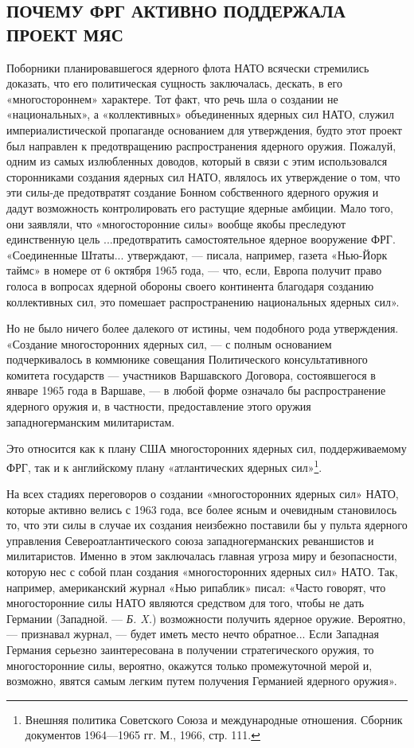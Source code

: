 \documentclass[12pt, a4paper, openany]{book}
\begin{document}
	\subsection[Почему ФРГ активно поддержала проект МЯС]{\center ПОЧЕМУ ФРГ АКТИВНО ПОДДЕРЖАЛА ПРОЕКТ МЯС}
	
	
	Поборники планировавшегося ядерного флота НАТО всячески стремились доказать, что его политическая сущность заключалась, дескать, в его «многостороннем» характере. Тот факт, что речь шла о создании не «национальных», а «коллективных» объединенных ядерных сил НАТО, служил империалистической пропаганде основанием для утверждения, будто этот проект был направлен к предотвращению распространения ядерного оружия. Пожалуй, одним из самых излюбленных доводов, который в связи с этим использовался сторонниками создания ядерных сил НАТО, являлось их утверждение о том, что эти силы-де предотвратят создание Бонном собственного ядерного оружия и дадут возможность контролировать его растущие ядерные амбиции. Мало того, они заявляли, что «многосторонние силы» вообще якобы преследуют единственную цель ...предотвратить самостоятельное ядерное вооружение ФРГ. «Соединенные Штаты... утверждают, — писала, например, газета «Нью-Йорк таймс» в номере от 6 октября 1965 года, — что, если, Европа получит право голоса в вопросах ядерной обороны своего континента благодаря созданию коллективных сил, это помешает распространению национальных ядерных сил».
		
	
	Но не было ничего более далекого от истины, чем подобного рода утверждения. «Создание многосторонних ядерных сил, — с полным основанием подчеркивалось в коммюнике совещания Политического консультативного комитета государств — участников Варшавского Договора, состоявшегося в январе 1965 года в Варшаве, — в любой форме означало бы распространение ядерного оружия и, в частности, предоставление этого оружия западногерманским милитаристам.
	
	Это относится как к плану США многосторонних ядерных сил, поддерживаемому ФРГ, так и к английскому плану «атлантических ядерных сил»{\footnote{Внешняя политика Советского Союза и международные отношения. Сборник документов 1964—1965 гг. М., 1966, стр. 111.
	}}.
	
На всех стадиях переговоров о создании «многосторонних ядерных сил» НАТО, которые активно велись с 1963 года, все более ясным и очевидным становилось то, что эти силы в случае их создания неизбежно поставили бы у пульта ядерного управления Североатлантического союза западногерманских реваншистов и милитаристов. Именно в этом заключалась главная угроза миру и безопасности, которую нес с собой план создания «многосторонних ядерных сил» НАТО. Так, например, американский журнал «Нью рипаблик» писал: «Часто говорят, что многосторонние силы НАТО являются средством для того, чтобы не дать Германии (Западной. — \textit{Б. X.}) возможности получить ядерное оружие. Вероятно, — признавал журнал, — будет иметь место нечто обратное... Если Западная Германия серьезно заинтересована в получении стратегического оружия, то многосторонние силы, вероятно, окажутся только промежуточной мерой и, возможно, явятся самым легким путем получения Германией ядерного оружия».
	
\end{document}
